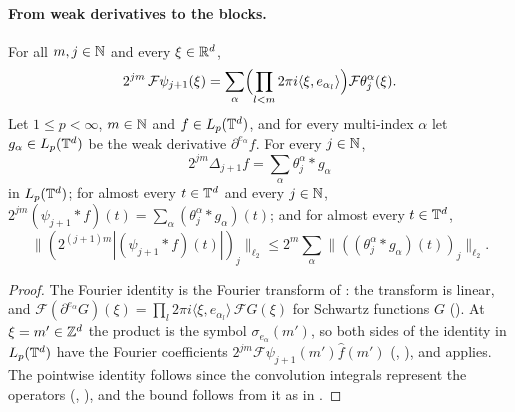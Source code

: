 \paragraph{From weak derivatives to the blocks.}

\begin{lemma}
\label{lem:torus-blocks-as-derivative-convolutions}
\leanok
{}
For all $m, j \in \mathbb{N}$ and every $\xi \in \mathbb{R}^d$,
\[
  2^{jm} \, \mathcal{F}\psi_{j+1}(\xi)
  = \sum_\alpha \Bigl( \prod_{l < m} 2\pi i \langle \xi, e_{\alpha_l} \rangle \Bigr)
    \mathcal{F}\theta^\alpha_j(\xi) .
\]
Let $1 \leq p < \infty$, $m \in \mathbb{N}$ and $f \in L_p(\mathbb{T}^d)$, and for every multi-index $\alpha$
let $g_\alpha \in L_p(\mathbb{T}^d)$ be the weak derivative $\partial^{e_\alpha} f$. For every $j \in \mathbb{N}$,
\[
  2^{jm} \Delta_{j+1} f = \sum_\alpha \theta^\alpha_j * g_\alpha
\]
in $L_p(\mathbb{T}^d)$; for almost every $t \in \mathbb{T}^d$ and every $j \in \mathbb{N}$,
$2^{jm} (\psi_{j+1} * f)(t) = \sum_\alpha (\theta^\alpha_j * g_\alpha)(t)$; and for almost every
$t \in \mathbb{T}^d$,
\[
  \bigl\| (2^{(j+1)m} |(\psi_{j+1} * f)(t)|)_j \bigr\|_{\ell_2}
  \leq 2^m \sum_\alpha \bigl\| ((\theta^\alpha_j * g_\alpha)(t))_j \bigr\|_{\ell_2} .
\]
\end{lemma}

\begin{proof}
\leanok
The Fourier identity is the Fourier transform of : the
transform is linear, and $\mathcal{F}(\partial^{e_\alpha} G)(\xi)
= \prod_l 2\pi i \langle \xi, e_{\alpha_l} \rangle \, \mathcal{F}G(\xi)$ for Schwartz functions
$G$ (). At $\xi = m' \in \mathbb{Z}^d$ the product is the symbol
$\sigma_{e_\alpha}(m')$, so both sides of the identity in $L_p(\mathbb{T}^d)$ have the Fourier
coefficients $2^{jm} \mathcal{F}\psi_{j+1}(m') \hat f(m')$
(, ), and
 applies. The pointwise identity follows since the
convolution integrals represent the operators (,
), and the bound follows from it as in
.
\end{proof}

